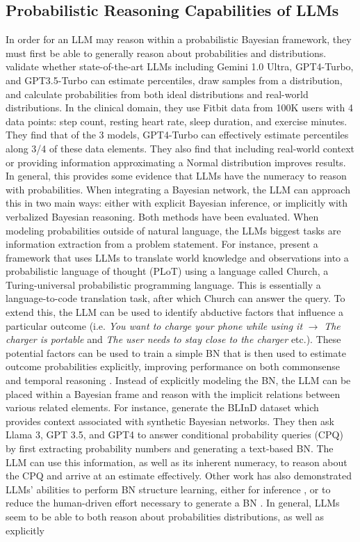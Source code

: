 \subsection{Probabilistic Reasoning Capabilities of LLMs}
In order for an LLM may reason within a probabilistic Bayesian framework, they must first be able to generally reason about probabilities and distributions. \citet{paruchuriWhatAreOdds2024} validate whether state-of-the-art LLMs including Gemini 1.0 Ultra, GPT4-Turbo, and GPT3.5-Turbo can estimate percentiles, draw samples from a distribution, and calculate probabilities from both ideal distributions and real-world distributions. In the clinical domain, they use Fitbit data from 100K users with 4 data points: step count, resting heart rate, sleep duration, and exercise minutes. They find that of the 3 models, GPT4-Turbo can effectively estimate percentiles along 3/4 of these data elements. They also find that including real-world context or providing information approximating a Normal distribution improves results. In general, this provides some evidence that LLMs have the numeracy to reason with probabilities. When integrating a Bayesian network, the LLM can approach this in two main ways: either with explicit Bayesian inference, or implicitly with verbalized Bayesian reasoning. Both methods have been evaluated. When modeling probabilities outside of natural language, the LLMs biggest tasks are information extraction from a problem statement. For instance, \citet{wongWordModelsWorld2023} present a framework that uses LLMs to translate world knowledge and observations into a probabilistic language of thought (PLoT) using a language called Church, a Turing-universal probabilistic programming language. This is essentially a language-to-code translation task, after which Church can answer the query. To extend this, the LLM can be used to identify abductive factors that influence a particular outcome (i.e. \emph{You want to charge your phone while using it} $\rightarrow$ \emph{The charger is portable} and \emph{The user needs to stay close to the charger} etc.). These potential factors can be used to train a simple BN that is then used to estimate outcome probabilities explicitly, improving performance on both commonsense and temporal reasoning \citep{fengBIRDTrustworthyBayesian2024}. Instead of explicitly modeling the BN, the LLM can be placed within a Bayesian frame and reason with the implicit relations between various related elements. For instance, \citet{nafarProbabilisticReasoningGenerative2024} generate the BLInD dataset which provides context associated with synthetic Bayesian networks. They then ask Llama 3, GPT 3.5, and GPT4 to answer conditional probability queries (CPQ) by first extracting probability numbers and generating a text-based BN. The LLM can use this information, as well as its inherent numeracy, to reason about the CPQ and arrive at an estimate effectively. Other work has also demonstrated LLMs' abilities to perform BN structure learning, either for inference \citep{huangVerbalizedProbabilisticGraphical2024}, or to reduce the human-driven effort necessary to generate a BN \citep{babakovScalabilityBayesianNetwork2024}. In general, LLMs seem to be able to both reason about probabilities distributions, as well as explicitly 